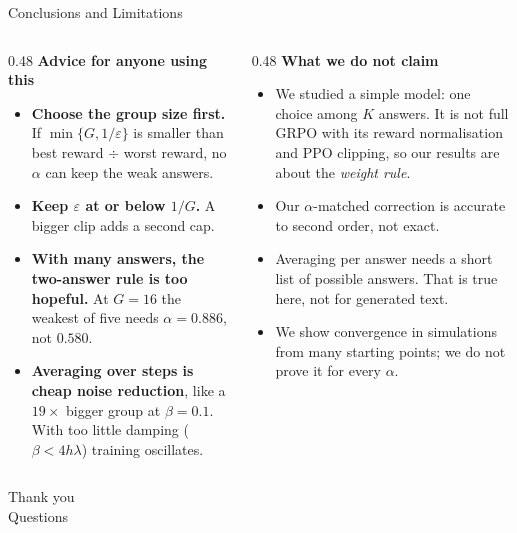 \documentclass[aspectratio=169,10pt]{beamer}
\begin{document}
\begin{frame}{Conclusions and Limitations}

\begin{columns}[T,onlytextwidth]
\begin{column}{0.48\textwidth}
\footnotesize
\textbf{Advice for anyone using this}

\begin{itemize}\setlength\itemsep{3pt}
  \item \textbf{Choose the group size first.} If $\min\{G,1/\varepsilon\}$ is
        smaller than best reward $\div$ worst reward, no $\alpha$ can keep the
        weak answers.
  \item \textbf{Keep $\varepsilon$ at or below $1/G$.} A bigger clip adds a
        second cap.
  \item \textbf{With many answers, the two-answer rule is too hopeful.} At
        $G=16$ the weakest of five needs $\alpha=0.886$, not $0.580$.
  \item \textbf{Averaging over steps is cheap noise reduction}, like a
        $19\times$ bigger group at $\beta=0.1$. With too little damping
        ($\beta<4h\lambda$) training oscillates.
\end{itemize}
\end{column}

\begin{column}{0.48\textwidth}
\footnotesize
\textbf{What we do not claim}

\begin{itemize}\setlength\itemsep{3pt}
  \item We studied a simple model: one choice among $K$ answers. It is not full
        GRPO with its reward normalisation and PPO clipping, so our results are
        about the \emph{weight rule}.
  \item Our $\alpha$-matched correction is accurate to second order, not exact.
  \item Averaging per answer needs a short list of possible answers. That is
        true here, not for generated text.
  \item We show convergence in simulations from many starting points; we do
        not prove it for every $\alpha$.
\end{itemize}
\end{column}
\end{columns}
\end{frame}

\begin{frame}[standout]
  Thank you\\[2mm]
  {\normalsize Questions}
\end{frame}
\end{document}
